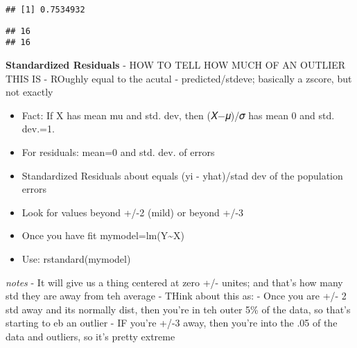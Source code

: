\documentclass[
]{article}
\newenvironment{Shaded}{\begin{snugshade}}{\end{snugshade}}
\newcommand{\CommentTok}[1]{\textcolor[rgb]{0.56,0.35,0.01}{\textit{#1}}}
\newcommand{\FunctionTok}[1]{\textcolor[rgb]{0.00,0.00,0.00}{#1}}
\newcommand{\NormalTok}[1]{#1}
\newcommand{\SpecialCharTok}[1]{\textcolor[rgb]{0.00,0.00,0.00}{#1}}
\begin{document}
\begin{Shaded}
\end{Shaded}

\begin{verbatim}
## [1] 0.7534932
\end{verbatim}

\begin{Shaded}
\end{Shaded}

\begin{verbatim}
## 16 
## 16
\end{verbatim}

\textbf{Standardized Residuals} - HOW TO TELL HOW MUCH OF AN OUTLIER
THIS IS - ROughly equal to the acutal - predicted/stdeve; basically a
zscore, but not exactly

\begin{itemize}
\item
  Fact: If X has mean mu and std. dev, then (𝑋−𝜇)/𝜎 has mean 0 and std.
  dev.=1.
\item
  For residuals: mean=0 and std. dev. of errors
\item
  Standardized Residuals about equals (yi - yhat)/stad dev of the
  population errors
\item
  Look for values beyond +/-2 (mild) or beyond +/-3
\item
  Once you have fit mymodel=lm(Y\textasciitilde X)
\item
  Use: rstandard(mymodel)
\end{itemize}

\emph{notes} - It will give us a thing centered at zero +/- unites; and
that's how many std they are away from teh average - THink about this
as: - Once you are +/- 2 std away and its normally dist, then you're in
teh outer 5\% of the data, so that's starting to eb an outlier - IF
you're +/-3 away, then you're into the .05 of the data and outliers, so
it's pretty extreme
\end{document}
